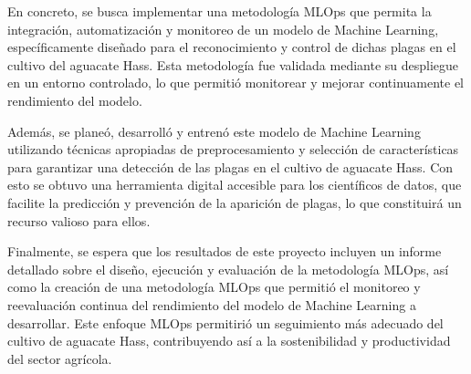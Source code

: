 \begin{enumerate}
    En concreto, se busca implementar una metodología MLOps que permita la integración, automatización y monitoreo de un modelo de Machine Learning, específicamente diseñado para el reconocimiento y control de dichas plagas en el cultivo del aguacate Hass. Esta metodología fue validada mediante  su despliegue en un entorno controlado, lo que permitió monitorear y mejorar continuamente el rendimiento del modelo.

    Además, se planeó, desarrolló y entrenó este modelo de Machine Learning utilizando técnicas apropiadas de preprocesamiento y selección de características para garantizar una detección de las plagas en el cultivo de aguacate Hass. Con esto se obtuvo una herramienta digital accesible para los científicos de datos, que facilite la predicción y prevención de la aparición de plagas, lo que constituirá un recurso valioso para ellos.

    Finalmente, se espera que los resultados de este proyecto incluyen un informe detallado sobre el diseño, ejecución y evaluación de la metodología MLOps, así como la creación de una metodología MLOps que permitió el monitoreo y reevaluación continua del rendimiento del modelo de Machine Learning a desarrollar. Este enfoque MLOps permitirió un seguimiento más adecuado del cultivo de aguacate Hass, contribuyendo así a la sostenibilidad y productividad del sector agrícola.
\end{enumerate}
